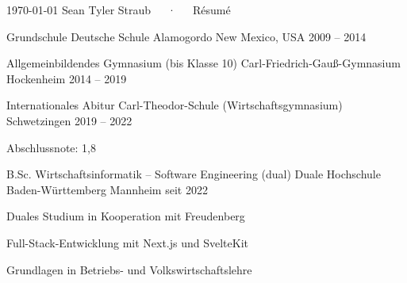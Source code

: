 \documentclass[11pt, a4paper]{awesome-cv}
\begin{document}
\makecvheader[C]

\makecvfooter
  {\today}
  {Sean Tyler Straub~~~·~~~Résumé}
  {\thepage}


\begin{cventries}

\cventry
  {Grundschule}
  {Deutsche Schule Alamogordo}
  {New Mexico, USA}
  {2009 -- 2014}
  {}

\cventry
  {Allgemeinbildendes Gymnasium (bis Klasse 10)}
  {Carl-Friedrich-Gauß-Gymnasium}
  {Hockenheim}
  {2014 -- 2019}
  {}

\cventry
  {Internationales Abitur}
  {Carl-Theodor-Schule (Wirtschaftsgymnasium)}
  {Schwetzingen}
  {2019 -- 2022}
  {
    \begin{cvitems}
      \item {Abschlussnote: 1,8}
    \end{cvitems}
  }

\cventry
  {B.Sc. Wirtschaftsinformatik – Software Engineering (dual)}
  {Duale Hochschule Baden-Württemberg}
  {Mannheim}
  {seit 2022}
  {
    \begin{cvitems}
      \item {Duales Studium in Kooperation mit Freudenberg}
      \item {Full-Stack-Entwicklung mit Next.js und SvelteKit}
      \item {Grundlagen in Betriebs- und Volkswirtschaftslehre}
    \end{cvitems}
  }

\end{cventries}

\end{document}
